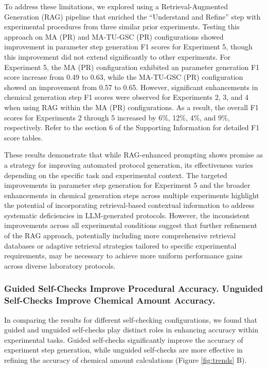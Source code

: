 \documentclass[sn-nature, twocolumn]{sn-jnl}%
\theoremstyle{thmstyleone}%
\theoremstyle{thmstyletwo}%
\theoremstyle{thmstylethree}%
\begin{document}
To address these limitations, we explored using a Retrieval-Augmented Generation (RAG)\cite{gao2024retrievalaugmentedgenerationlargelanguage, fan2024surveyragmeetingllms} pipeline that enriched the ``Understand and Refine'' step with experimental procedures from three similar prior experiments. Testing this approach on MA (PR) and MA-TU-GSC (PR) configurations showed improvement in parameter step generation F1 scores for Experiment 5, though this improvement did not extend significantly to other experiments. For Experiment 5, the MA (PR) configuration exhibited an parameter generation F1 score increase from 0.49 to 0.63, while the MA-TU-GSC (PR) configuration showed an improvement from 0.57 to 0.65. However, significant enhancements in chemical generation step F1 scores were observed for Experiments 2, 3, and 4 when using RAG within the MA (PR) configurations. As a result, the overall F1 scores for Experiments 2 through 5 increased by 6\%, 12\%, 4\%, and 9\%, respectively. Refer to the section 6 of the Supporting Information for detailed F1 score tables.



These results demonstrate that while RAG-enhanced prompting shows promise as a strategy for improving automated protocol generation, its effectiveness varies depending on the specific task and experimental context. The targeted improvements in parameter step generation for Experiment 5 and the broader enhancements in chemical generation steps across multiple experiments highlight the potential of incorporating retrieval-based contextual information to address systematic deficiencies in LLM-generated protocols. However, the inconsistent improvements across all experimental conditions suggest that further refinement of the RAG approach, potentially including more comprehensive retrieval databases or adaptive retrieval strategies tailored to specific experimental requirements, may be necessary to achieve more uniform performance gains across diverse laboratory protocols.



\subsubsection{Guided Self-Checks Improve Procedural Accuracy. Unguided Self-Checks Improve Chemical Amount Accuracy.}

In comparing the results for different self-checking configurations, we found that guided and unguided self-checks play distinct roles in enhancing accuracy within experimental tasks. Guided self-checks significantly improve the accuracy of experiment step generation, while unguided self-checks are more effective in refining the accuracy of chemical amount calculations (Figure \ref{fig:trends} B).
\end{document}
